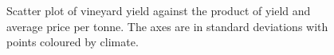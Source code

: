 \documentclass[review,12pt,authoryear]{elsarticle}
\begin{document}
\begin{linenumbers}
\begin{figure}
  \caption{Scatter plot of vineyard yield against the product of yield and average price per tonne. The axes are in standard deviations with points coloured by climate.}\label{fig:yield_vs_value}
\end{figure}
%
\begin{figure}

\end{figure}
\end{linenumbers}
\end{document}
